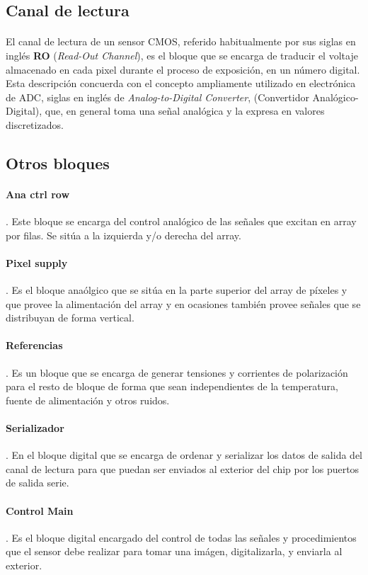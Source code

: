 \subsection{Canal de lectura}

\paragraph{}
El canal de lectura de un sensor CMOS, referido habitualmente por sus
siglas en inglés \textbf{RO} (\textit{Read-Out Channel}), es el bloque que se
encarga de traducir el voltaje almacenado en cada pixel durante el proceso
de exposición, en un número digital. Esta descripción concuerda con el concepto
ampliamente utilizado en electrónica de ADC, siglas en inglés de \textit{Analog-to-Digital
Converter}, (Convertidor Analógico-Digital), que, en general toma una señal
analógica y la expresa en valores discretizados.

\subsection{Otros bloques}

\paragraph{Ana ctrl row}. Este bloque se encarga del control analógico de las
señales que excitan en array por filas. Se sitúa a la izquierda y/o derecha del
array.

\paragraph{Pixel supply}. Es el bloque anaólgico que se sitúa en la parte superior
del array de píxeles y que provee la alimentación del array
y en ocasiones también provee señales que se distribuyan de forma vertical.

\paragraph{Referencias}. Es un bloque que se encarga de generar tensiones y corrientes
de polarización para el resto de bloque de forma que sean independientes de la
temperatura, fuente de alimentación y otros ruidos.

\paragraph{Serializador}. En el bloque digital que se encarga de ordenar y serializar
los datos de salida del canal de lectura para que puedan ser enviados al exterior del
chip por los puertos de salida serie.

\paragraph{Control Main}. Es el bloque digital encargado del control de todas las
señales y procedimientos que el sensor debe realizar para tomar una imágen, digitalizarla,
y enviarla al exterior.
